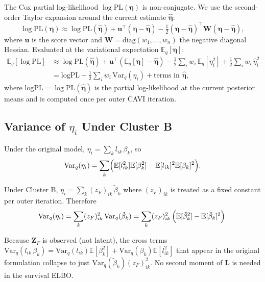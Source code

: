 \documentclass[11pt]{article}
\newcommand{\E}{\mathbb{E}}
\newcommand{\Var}{\mathrm{Var}}
\newcommand{\diag}{\mathrm{diag}}
\begin{document}
The Cox partial log-likelihood $\log\mathrm{PL}(\boldsymbol\eta)$ is non-conjugate.
We use the second-order Taylor expansion around the current estimate $\hat{\boldsymbol\eta}$:
\[
  \log\mathrm{PL}(\boldsymbol\eta) \approx
  \log\mathrm{PL}(\hat{\boldsymbol\eta})
  + \mathbf{u}^\top(\boldsymbol\eta - \hat{\boldsymbol\eta})
  - \tfrac{1}{2}(\boldsymbol\eta - \hat{\boldsymbol\eta})^\top\mathbf{W}(\boldsymbol\eta - \hat{\boldsymbol\eta}),
\]
where $\mathbf{u}$ is the score vector and $\mathbf{W} = \diag(w_1,\ldots,w_n)$ the negative
diagonal Hessian. Evaluated at the variational expectation $\E_q[\boldsymbol\eta]$:
\begin{align}
  \E_q[\log\mathrm{PL}]
  &\approx \log\mathrm{PL}(\hat{\boldsymbol\eta})
    + \mathbf{u}^\top(\E_q[\boldsymbol\eta] - \hat{\boldsymbol\eta})
    - \tfrac{1}{2}\sum_i w_i\,\E_q[\eta_i^2]
    + \tfrac{1}{2}\sum_i w_i\,\hat\eta_i^2 \nonumber\\
  &= \mathrm{logPL}
    - \tfrac{1}{2}\sum_i w_i\,\Var_q(\eta_i) + \text{terms in } \hat{\boldsymbol\eta},
  \label{eq:surv-elbo}
\end{align}
where $\mathrm{logPL} = \log\mathrm{PL}(\hat{\boldsymbol\eta})$ is the partial log-likelihood
at the current posterior means and is computed once per outer CAVI iteration.

\subsection{Variance of $\eta_i$ Under Cluster B}

Under the original model, $\eta_i = \sum_k l_{ik}\,\beta_k$, so
\[
  \Var_q(\eta_i) = \sum_k\Bigl(\E[l_{ik}^2]\E[\beta_k^2] - \E[l_{ik}]^2\E[\beta_k]^2\Bigr).
\]

Under Cluster B, $\eta_i = \sum_k (z_F)_{ik}\,\tilde\beta_k$ where $(z_F)_{ik}$ is treated
as a fixed constant per outer iteration. Therefore
\begin{equation}
  \Var_q(\eta_i) = \sum_k (z_F)_{ik}^2\,\Var_q(\tilde\beta_k)
                 = \sum_k (z_F)_{ik}^2\,\Bigl(\E[\tilde\beta_k^2] - \E[\tilde\beta_k]^2\Bigr).
  \label{eq:var-eta-new}
\end{equation}

\begin{derivbox}
Because $\mathbf{Z}_F$ is observed (not latent), the cross terms
$\Var_q(l_{ik}\,\beta_k) = \Var_q(l_{ik})\E[\beta_k^2] + \Var_q(\beta_k)\E[l_{ik}^2]$
that appear in the original formulation collapse to just $\Var_q(\tilde\beta_k)(z_F)_{ik}^2$.
No second moment of $\mathbf{L}$ is needed in the survival ELBO.
\end{derivbox}
\end{document}
